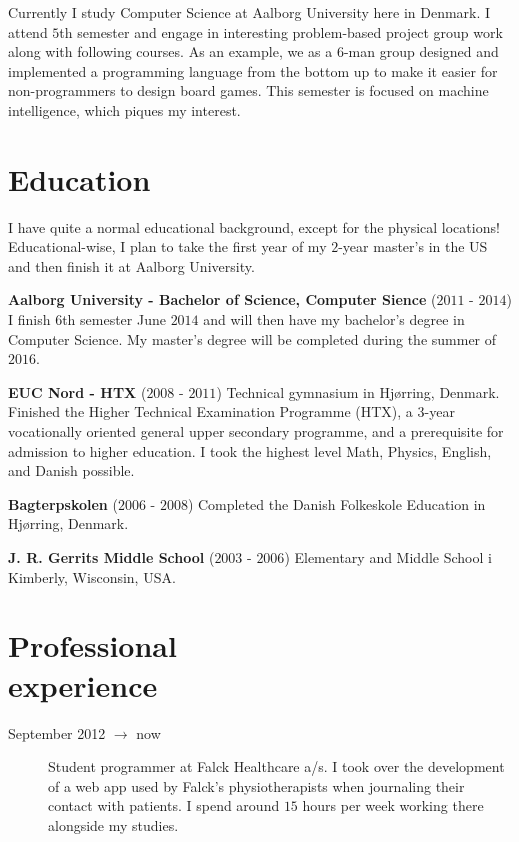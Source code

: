\documentclass[margin,line,a4paper]{resume}
\begin{document}
\begin{resume}
    Currently I study Computer Science at Aalborg University here
    in Denmark. I attend $5$th semester and engage in interesting
    problem-based project group work along with following courses.
    As an example, we as a $6$-man group designed and implemented a
    programming language from the bottom up to make it easier for
    non-programmers to design board games. This semester is focused on
    machine intelligence, which piques my interest.

    \section{\mysidestyle Education}
    I have quite a normal educational background, except for the
    physical locations! Educational-wise, I plan to take the first year of
    my $2$-year master's in the US and then finish it at Aalborg University.

    \textbf{Aalborg University - Bachelor of Science, Computer Sience}
    ($2011$ - $2014$) I finish $6$th semester June $2014$ and will then
    have my bachelor's degree in Computer Science. My master's degree
    will be completed during the summer of $2016$.
      
    \textbf{EUC Nord - HTX} ($2008$ - $2011$) Technical gymnasium
    in Hjørring, Denmark. Finished the Higher Technical Examination
    Programme (HTX), a $3$-year vocationally oriented general upper
    secondary programme, and a prerequisite for admission to higher
    education. I took the highest level Math, Physics, English, and
    Danish possible.
    
    \textbf{Bagterpskolen} ($2006$ - $2008$) Completed the Danish
    Folkeskole Education in Hjørring, Denmark.

    \textbf{J. R. Gerrits Middle School} ($2003$ - $2006$) Elementary and 
    Middle School i Kimberly, Wisconsin, USA.

\pagebreak
\section{\mysidestyle Professional\\experience}\vspace{1mm}
\begin{description}

  \item[September 2012 $\rightarrow$ now] Student programmer at Falck
  Healthcare a/s. I took over the development of a web app used by
  Falck's physiotherapists when journaling their contact with patients.
  I spend around $15$ hours per week working there alongside my studies.


\end{description}
\end{resume}
\end{document}
